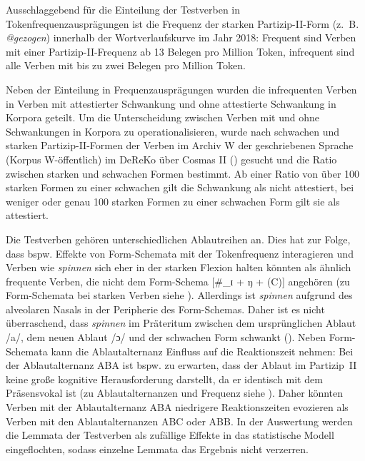Ausschlaggebend für die Einteilung der Testverben in Tokenfrequenzausprägungen ist die Frequenz der starken Partizip-II-Form (z.~B. \textit{@gezogen}) innerhalb der Wortverlaufskurve im Jahr 2018: Frequent sind Verben mit einer Partizip-II-Frequenz ab 13 Belegen pro Million Token, infrequent sind alle Verben mit bis zu zwei Belegen pro Million Token. 



Neben der Einteilung in Frequenzausprägungen wurden die infrequenten Verben in Verben mit attestierter Schwankung und ohne attestierte Schwankung in Korpora geteilt. Um die Unterscheidung zwischen Verben mit und ohne Schwankungen in Korpora zu operationalisieren, wurde nach schwachen und starken Partizip-II-Formen der Verben im Archiv W der geschriebenen Sprache (Korpus W-öffentlich) im DeReKo über Cosmas II (\cite{LeibnizInstitutfurDeutscheSprache.2019b}) gesucht und die Ratio zwischen starken und schwachen Formen bestimmt. Ab einer Ratio von über 100 starken Formen zu einer schwachen gilt die Schwankung als nicht attestiert, bei weniger oder genau 100 starken Formen zu einer schwachen Form gilt sie als attestiert. 

Die Testverben gehören unterschiedlichen Ablautreihen an. Dies hat zur Folge, dass bspw. Effekte von Form-Schemata mit der Tokenfrequenz interagieren und Verben wie \textit{spinnen} sich eher in der starken Flexion halten könnten als ähnlich frequente Verben, die nicht dem Form-Schema [\#\_ɪ + ŋ + (C)] angehören (zu Form-Schemata bei starken Verben siehe ). Allerdings ist \textit{spinnen} aufgrund des alveolaren Nasals in der Peripherie des Form-Schemas. Daher ist es nicht überraschend, dass \textit{spinnen} im Präteritum zwischen dem ursprünglichen Ablaut /a/, dem neuen Ablaut /ɔ/ und der schwachen Form schwankt (\cite[172--175]{Nowak.2013}). Neben Form-Schemata kann die Ablautalternanz Einfluss auf die Reaktionszeit nehmen: Bei der Ablautalternanz ABA ist bspw. zu erwarten, dass der Ablaut im Partizip~II keine große kognitive Herausforderung darstellt, da er identisch mit dem Präsensvokal ist (zu Ablautalternanzen und Frequenz siehe ). Daher könnten Verben mit der  Ablautalternanz ABA niedrigere Reaktionszeiten evozieren als Verben mit den Ablautalternanzen ABC oder ABB. In der Auswertung werden die Lemmata der Testverben als zufällige Effekte in das statistische Modell eingeflochten, sodass einzelne Lemmata das Ergebnis nicht verzerren.\largerpage

